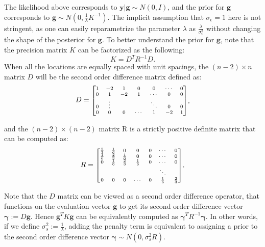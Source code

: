 \documentclass{article}
\begin{document}
The likelihood above corresponds to $\boldsymbol{y}|\boldsymbol{g} \sim N(0, I)$, and the prior for $\boldsymbol{g}$ corresponds to $\boldsymbol{g} \sim N(0, \frac{1}{\lambda} K^{-1})$. The implicit assumption that $\sigma_\epsilon = 1$ here is not stringent, as one can easily reparametrize the parameter $\lambda$ as $\frac{\lambda}{\sigma_\epsilon^2}$ without changing the shape of the posterior for $\boldsymbol{g}$.
To better understand the prior for $\boldsymbol{g}$, note that the precision matrix $K$ can be factorized as the following:
\begin{equation}\label{equ:ArimaPrior}
K = D^T R^{-1} D.
\end{equation}
When all the locations are equally spaced with unit spacings, the $(n-2) \times n$ matrix $D$ will be the second order difference matrix defined as:
\begin{equation}
\begin{aligned}
D = \mbox{\scriptsize $\begin{bmatrix}
1 & -2 & 1 & 0 & 0 & \cdots & 0\\
0 & 1 & -2 & 1 & \cdots & 0 & 0\\
0 & \vdots &  &  & \ddots & 0 & 0\\
0 & 0 & 0 & \cdots & 1 & -2 & 1\\
\end{bmatrix}$}
\end{aligned},
\end{equation}

and the $(n-2) \times (n-2)$ matrix R is a strictly positive definite matrix that can be computed as:
\begin{equation}
\begin{aligned}
R = \mbox{\scriptsize $\begin{bmatrix}
\frac{2}{3} & \frac{1}{6} & 0 & 0 & 0 & \cdots & 0\\
\frac{1}{6} & \frac{2}{3} & \frac{1}{6} & 0 & 0 & \cdots & 0\\
0 & \frac{1}{6} & \frac{2}{3} & \frac{1}{6} & 0 & \cdots & 0\\
 &  &  &  &  & \ddots & \\
0 & 0 & 0 & \cdots & 0 & \frac{1}{6} & \frac{2}{3}\\
\end{bmatrix}$}
\end{aligned}.
\end{equation}

Note that the $D$ matrix can be viewed as a second order difference operator, that functions on the evaluation vector $\textbf{g}$ to get its second order difference vector $\boldsymbol \gamma := D \boldsymbol g$. Hence $\boldsymbol g^TK \boldsymbol g$ can be equivalently computed as $\boldsymbol \gamma^T R^{-1} \boldsymbol \gamma$. In other words, if we define $\sigma_s^2 := \frac{1}{\lambda}$, adding the penalty term is equivalent to assigning a prior to the second order difference vector $\boldsymbol \gamma \sim N(0,\sigma_s^2R)$.
\end{document}
